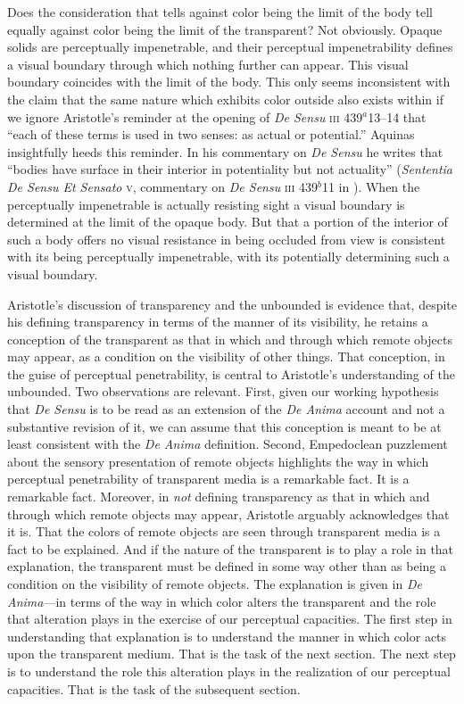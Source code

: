\documentclass[12pt]{article}
\begin{document}
Does the consideration that tells against color being the limit of the body tell equally against color being the limit of the transparent? Not obviously. Opaque solids are perceptually impenetrable, and their perceptual impenetrability defines a visual boundary through which nothing further can appear. This visual boundary coincides with the limit of the body. This only seems inconsistent with the claim that the same nature which exhibits color outside also exists within if we ignore Aristotle's reminder at the opening of \emph{De Sensu} \textsc{iii} 439\( ^{a} \)13--14 that ``each of these terms is used in two senses: as actual or potential.'' Aquinas insightfully heeds this reminder. In his commentary on \emph{De Sensu} he writes that ``bodies have surface in their interior in potentiality but not actuality'' (\emph{Sententia De Sensu Et Sensato} \textsc{v}, commentary on \emph{De Sensu} \textsc{iii} 439\( ^{b} \)11 in \citealt{White:2005vn}). When the perceptually impenetrable is actually resisting sight a visual boundary is determined at the limit of the opaque body. But that a portion of the interior of such a body offers no visual resistance in being occluded from view is consistent with its being perceptually impenetrable, with its potentially determining such a visual boundary. 

Aristotle's discussion of transparency and the unbounded is evidence that, despite his defining transparency in terms of the manner of its visibility, he retains a conception of the transparent as that in which and through which remote objects may appear, as a condition on the visibility of other things. That conception, in the guise of perceptual penetrability, is central to Aristotle's understanding of the unbounded. Two observations are relevant. First, given our working hypothesis that \emph{De Sensu} is to be read as an extension of the \emph{De Anima} account and not a substantive revision of it, we can assume that this conception is meant to be at least consistent with the \emph{De Anima} definition.  Second, Empedoclean puzzlement about the sensory presentation of remote objects highlights the way in which perceptual penetrability of transparent media is a remarkable fact. It is a remarkable fact. Moreover, in \emph{not} defining transparency as that in which and through which remote objects may appear, Aristotle arguably acknowledges that it is. That the colors of remote objects are seen through transparent media is a fact to be explained. And if the nature of the transparent is to play a role in that explanation, the transparent must be defined in some way other than as being a condition on the visibility of remote objects. The explanation is given in \emph{De Anima}---in terms of the way in which color alters the transparent and the role that alteration plays in the exercise of our perceptual capacities. The first step in understanding that explanation is to understand the manner in which color acts upon the transparent medium. That is the task of the next section. The next step is to understand the role this alteration plays in the realization of our perceptual capacities. That is the task of the subsequent section.
\end{document}

